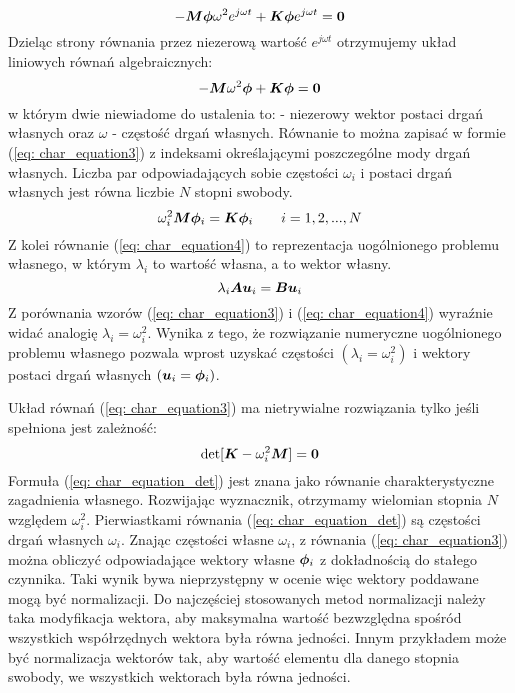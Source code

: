 \begin{equation} \label{eq: char_equation1}
-\bm{M}\bm{\phi}\omega^2 e^{j\omega t} +\bm{K\phi}e^{j\omega t} = \bm{0}
\end{equation}
Dzieląc strony równania przez niezerową wartość $e^{j\omega t}$ otrzymujemy układ liniowych równań algebraicznych:
\begin{equation} \label{eq: char_equation2}
-\bm{M}\omega^2 \bm{\phi} +\bm{K\phi} = \bm{0}
\end{equation}
w którym dwie niewiadome do ustalenia to: \vect{$\phi$} - niezerowy wektor postaci drgań własnych oraz $\omega$ - częstość drgań własnych. Równanie to można zapisać w formie (\ref{eq: char_equation3}) z indeksami określającymi poszczególne mody drgań własnych. Liczba par odpowiadających sobie częstości $\omega_i$ i postaci drgań własnych  jest równa liczbie $N$ stopni swobody. 
\begin{equation} \label{eq: char_equation3}
\omega^2_i \bm{M}\bm{\phi}_i = \bm{K}\bm{\phi}_i\qquad i=1,2,...,N
\end{equation}
Z kolei równanie (\ref{eq: char_equation4}) to reprezentacja uogólnionego problemu własnego, w którym $\lambda_i$ to wartość własna, a  to wektor własny.  
\begin{equation} \label{eq: char_equation4}
\lambda_i \bm{A}\bm{u}_i = \bm{B}\bm{u}_i
\end{equation}
Z porównania wzorów (\ref{eq: char_equation3}) i (\ref{eq: char_equation4}) wyraźnie widać analogię $\lambda_i=\omega^2_i$. Wynika z tego, że rozwiązanie numeryczne uogólnionego problemu własnego pozwala wprost uzyskać częstości $(\lambda_i=\omega^2_i)$ i wektory postaci drgań własnych $(\bm{u}_i=\bm{\phi}_i)$.

Układ równań (\ref{eq: char_equation3}) ma nietrywialne rozwiązania tylko jeśli spełniona jest zależność:
\begin{equation} \label{eq: char_equation_det}
\det[\bm{K}-\omega^2_i \bm{M}] = \bm{0}
\end{equation}
Formuła (\ref{eq: char_equation_det}) jest znana jako równanie charakterystyczne zagadnienia własnego. Rozwijając wyznacznik, otrzymamy wielomian stopnia $N$ względem $\omega^2_i$. Pierwiastkami równania (\ref{eq: char_equation_det}) są częstości drgań własnych $\omega_i$. Znając częstości własne $\omega_i$, z równania (\ref{eq: char_equation3}) można obliczyć odpowiadające wektory własne $\bm{\phi}_i$ z dokładnością do stałego czynnika. Taki wynik bywa nieprzystępny w ocenie więc wektory poddawane mogą być normalizacji. Do najczęściej stosowanych metod normalizacji należy taka modyfikacja wektora, aby maksymalna wartość bezwzględna spośród wszystkich współrzędnych wektora była równa jedności. Innym przykładem może być normalizacja wektorów tak, aby wartość elementu dla danego stopnia swobody, we wszystkich wektorach była równa jedności.

